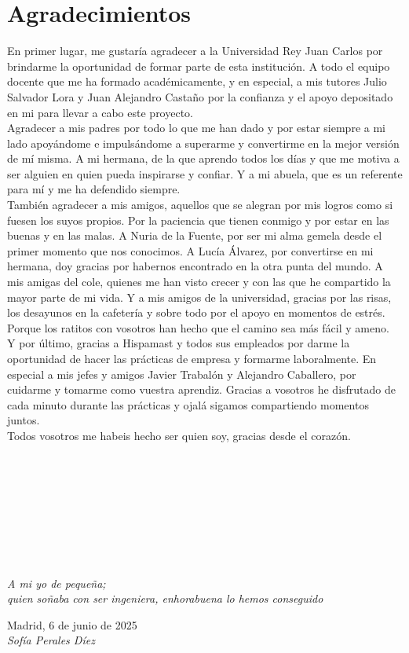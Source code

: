 \cleardoublepage

\chapter*{Agradecimientos}

En primer lugar, me gustaría agradecer a la Universidad Rey Juan Carlos por brindarme la oportunidad de formar parte de esta institución.
A todo el equipo docente que me ha formado académicamente, y en especial, a mis tutores Julio Salvador Lora y Juan Alejandro Castaño por la confianza y el apoyo depositado en mi para llevar a cabo este proyecto.\\

Agradecer a mis padres por todo lo que me han dado y por estar siempre a mi lado apoyándome e impulsándome a superarme y convertirme en la mejor versión de mí misma. 
A mi hermana, de la que aprendo todos los días y que me motiva a ser alguien en quien pueda inspirarse y confiar. 
Y a mi abuela, que es un referente para mí y me ha defendido siempre.\\

También agradecer a mis amigos, aquellos que se alegran por mis logros como si fuesen los suyos propios. 
Por la paciencia que tienen conmigo y por estar en las buenas y en las malas. 
A Nuria de la Fuente, por ser mi alma gemela desde el primer momento que nos conocimos. 
A Lucía Álvarez, por convertirse en mi hermana, doy gracias por habernos encontrado en la otra punta del mundo.
A mis amigas del cole, quienes me han visto crecer y con las que he compartido la mayor parte de mi vida.
Y a mis amigos de la universidad, gracias por las risas, los desayunos en la cafetería y sobre todo por el apoyo en momentos de estrés.
Porque los ratitos con vosotros han hecho que el camino sea más fácil y ameno.\\

Y por último, gracias a Hispamast y todos sus empleados por darme la oportunidad de hacer las prácticas de empresa y formarme laboralmente.
En especial a mis jefes y amigos Javier Trabalón y Alejandro Caballero, por cuidarme y tomarme como vuestra aprendiz. 
Gracias a vosotros he disfrutado de cada minuto durante las prácticas y ojalá sigamos compartiendo momentos juntos.\\

Todos vosotros me habeis hecho ser quien soy, gracias desde el corazón.\\
\ %

\

\

\

\

\begin{flushright}
		\vspace{4.0 cm}
		\emph{A mi yo de pequeña;\\
      quien soñaba con ser ingeniera,
	  enhorabuena lo hemos conseguido}\\
		\par
		\vspace{1.0 cm}
		Madrid, 6 de junio de 2025\\ %
		\emph{Sofía Perales Díez}
\end{flushright}

\thispagestyle{empty}

